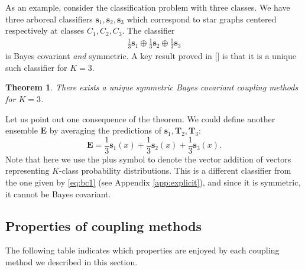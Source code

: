 \documentclass[twoside,11pt]{article}
\newtheorem{thm}{Theorem}
\begin{document}
% 

As an example, consider the classification problem with three classes. We have three arboreal classifiers $\boldsymbol{s}_1, \boldsymbol{s}_2, \boldsymbol{s}_3$ which correspond to star graphs centered respectively at classes $C_1, C_2, C_3$. The classifier 
\begin{align}
\frac13 \boldsymbol{s}_1 \oplus \frac13 \boldsymbol{s}_2 \oplus \frac 13 \boldsymbol{s}_3  \label{eq:bc1}
\end{align}
is Bayes covariant \emph{and} symmetric. A key result proved in [\cite{vsuch2016bayes}] is that it is a unique such classifier for $K=3$.

\begin{thm} \label{thm:K3}
	There exists a unique symmetric Bayes covariant coupling methods for $K=3$.
\end{thm}

Let us point out one consequence of the theorem. We could define another ensemble $\boldsymbol{E}$ by averaging the predictions of $\boldsymbol{s}_1, \boldsymbol{T}_2, \boldsymbol{T}_3$:
\[
\boldsymbol{E} = \frac13 \boldsymbol{s}_1(x) + \frac13 \boldsymbol{s}_2(x) + \frac 13 \boldsymbol{s}_3(x).
\]
Note that here we use the plus symbol to denote the vector addition of vectors representing $K$-class probability distributions. This is a different classifier from the one given by  \eqref{eq:bc1} (see Appendix \ref{app:explicit}), and since it is symmetric, it cannot be Bayes covariant.

\subsection{Properties of coupling methods}


The following table indicates which properties are enjoyed by each coupling method we described in this section.
\end{document}
